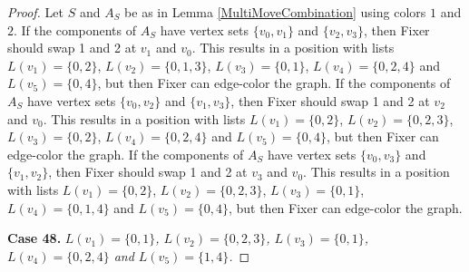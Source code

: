\documentclass[12pt]{amsart}
\theoremstyle{plain}
\theoremstyle{definition}
\theoremstyle{remark}
\begin{document}
\begin{proof}
Let $S$ and $A_S$ be as in Lemma \ref{MultiMoveCombination} using colors $1$ and $2$. If the components of $A_S$ have vertex sets $\{v_0, v_1\}$ and $\{v_2, v_3\}$, then Fixer should swap 1 and 2 at $v_1$ and $v_0$. This results in a position with lists $L(v_1) = \{0, 2\}$, $L(v_2) = \{0, 1, 3\}$, $L(v_3) = \{0, 1\}$, $L(v_4) = \{0, 2, 4\}$ and $L(v_5) = \{0, 4\}$, but then Fixer can edge-color the graph.
If the components of $A_S$ have vertex sets $\{v_0, v_2\}$ and $\{v_1, v_3\}$, then Fixer should swap 1 and 2 at $v_2$ and $v_0$. This results in a position with lists $L(v_1) = \{0, 2\}$, $L(v_2) = \{0, 2, 3\}$, $L(v_3) = \{0, 2\}$, $L(v_4) = \{0, 2, 4\}$ and $L(v_5) = \{0, 4\}$, but then Fixer can edge-color the graph.
If the components of $A_S$ have vertex sets $\{v_0, v_3\}$ and $\{v_1, v_2\}$, then Fixer should swap 1 and 2 at $v_3$ and $v_0$. This results in a position with lists $L(v_1) = \{0, 2\}$, $L(v_2) = \{0, 2, 3\}$, $L(v_3) = \{0, 1\}$, $L(v_4) = \{0, 1, 4\}$ and $L(v_5) = \{0, 4\}$, but then Fixer can edge-color the graph.

\noindent\textbf{Case 48.  }\textit{$L(v_1) = \{0, 1\}$, $L(v_2) = \{0, 2, 3\}$, $L(v_3) = \{0, 1\}$, $L(v_4) = \{0, 2, 4\}$ and $L(v_5) = \{1, 4\}$.}


\end{proof}
\end{document}
